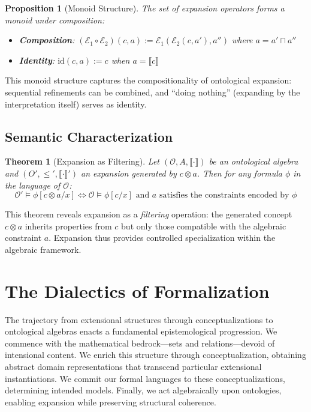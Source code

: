 \documentclass[11pt,a4paper]{article}
\newtheorem{theorem}[definition]{Theorem}
\newtheorem{proposition}[definition]{Proposition}
\newcommand{\onto}{\mathcal{O}}
\newcommand{\sem}[1]{\llbracket #1 \rrbracket}
\begin{document}
\begin{proposition}[Monoid Structure]
The set of expansion operators forms a monoid under composition:
\begin{itemize}
    \item \textbf{Composition}: $(\mathcal{E}_1 \circ \mathcal{E}_2)(c, a) := \mathcal{E}_1(\mathcal{E}_2(c, a'), a'')$ where $a = a' \sqcap a''$
    \item \textbf{Identity}: $\text{id}(c, a) := c$ when $a = \sem{c}$
\end{itemize}
\end{proposition}

This monoid structure captures the compositionality of ontological expansion: sequential refinements can be combined, and ``doing nothing'' (expanding by the interpretation itself) serves as identity.

\subsection{Semantic Characterization}

\begin{theorem}[Expansion as Filtering]
Let $(\onto, A, \sem{\cdot})$ be an ontological algebra and $(O', \leq', \sem{\cdot}')$ an expansion generated by $c \otimes a$. Then for any formula $\phi$ in the language of $\onto$:
$$
\onto' \models \phi[c \otimes a / x] \iff \onto \models \phi[c/x] \text{ and } a \text{ satisfies the constraints encoded by } \phi
$$
\end{theorem}

This theorem reveals expansion as a \emph{filtering} operation: the generated concept $c \otimes a$ inherits properties from $c$ but only those compatible with the algebraic constraint $a$. Expansion thus provides controlled specialization within the algebraic framework.

\section{The Dialectics of Formalization}

The trajectory from extensional structures through conceptualizations to ontological algebras enacts a fundamental epistemological progression. We commence with the mathematical bedrock---sets and relations---devoid of intensional content. We enrich this structure through conceptualization, obtaining abstract domain representations that transcend particular extensional instantiations. We commit our formal languages to these conceptualizations, determining intended models. Finally, we act algebraically upon ontologies, enabling expansion while preserving structural coherence.
\end{document}

